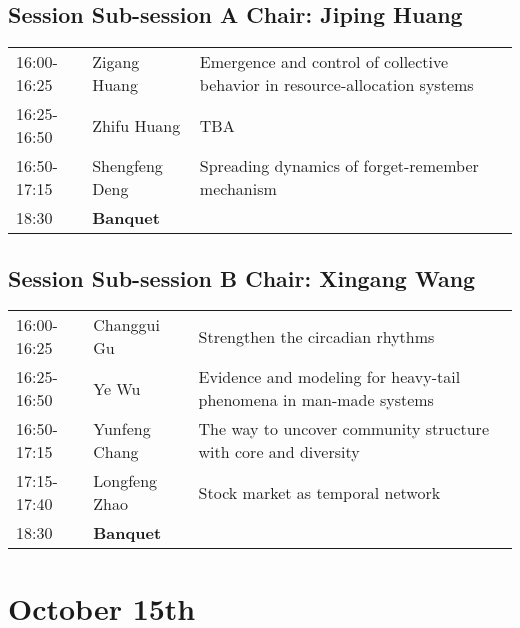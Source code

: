 \documentclass[oneside,A4paper,12pt]{article}
\begin{document}
\subsection*{Session \uppercase\expandafter{} \hspace{10mm} Sub-session A \hspace{10mm} Chair: Jiping Huang}
\label{sec:org2968485}

\begin{center}
\begin{tabular}{p{2.5cm}p{4cm}p{8.5cm}}
\toprule
16:00-16:25 & Zigang Huang & Emergence and control of collective behavior in resource-allocation systems\\
16:25-16:50 & Zhifu Huang & TBA\\
16:50-17:15 & Shengfeng Deng & Spreading dynamics of forget-remember mechanism\\
\cellcolor{blue!25}18:30 & \cellcolor{blue!25} \textbf{Banquet} & \cellcolor{blue!25}\\
\bottomrule
\end{tabular}
\end{center}


\subsection*{Session \uppercase\expandafter{} \hspace{10mm} Sub-session B \hspace{10mm} Chair: Xingang Wang}
\label{sec:org1b8d6c1}

\begin{center}
\begin{tabular}{p{2.5cm}p{4cm}p{8.5cm}}
\toprule
16:00-16:25 & Changgui Gu & Strengthen the circadian rhythms\\
16:25-16:50 & Ye Wu & Evidence and modeling for heavy-tail phenomena in man-made systems\\
16:50-17:15 & Yunfeng Chang & The way to uncover community structure with core and diversity\\
17:15-17:40 & Longfeng  Zhao & Stock market as temporal network\\
\cellcolor{blue!25}18:30 & \cellcolor{blue!25}\textbf{Banquet} & \cellcolor{blue!25}\\
\bottomrule
\end{tabular}
\end{center}


\section*{October 15th}
\label{sec:org437dec7}
\end{document}
